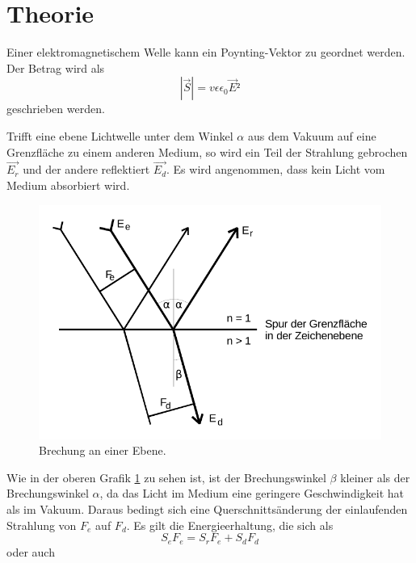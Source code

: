 \section{Theorie}
\label{sec:Theorie}

Einer elektromagnetischem Welle kann ein Poynting-Vektor zu geordnet werden. Der Betrag wird als 
\begin{equation}
    \left| \vec{S}\right|  = v \epsilon \epsilon_0  \vec{E}²
    \label{eq:betragpoynting}
\end{equation}
 geschrieben werden.

Trifft eine ebene Lichtwelle unter dem Winkel  $\alpha$  aus dem Vakuum auf eine Grenzfläche zu einem anderen Medium, so wird ein Teil der Strahlung gebrochen $\vec{E_r}$ und der andere reflektiert $\vec{E_d}$. Es wird angenommen, dass kein Licht vom Medium absorbiert wird.


\begin{figure}
    \centering
    \includegraphics{Brechung an einer Ebene.pdf}
    \caption{Brechung an einer Ebene.} 
    \label{fig:abb1}
\end{figure}

Wie in der oberen Grafik \ref{fig:abb1} zu sehen ist, ist der Brechungswinkel $ \beta$ kleiner als der Brechungswinkel $\alpha$, da das Licht im Medium eine geringere Geschwindigkeit hat als im Vakuum.
Daraus bedingt sich eine Querschnittsänderung der einlaufenden Strahlung von $F_e$ auf $F_d$. 
Es gilt die Energieerhaltung, die sich als
\begin{equation}
    S_e F_e = S_r F_e +  S_d F_d
    \label{eq:Energieerhaltung}
\end{equation}
oder auch 

